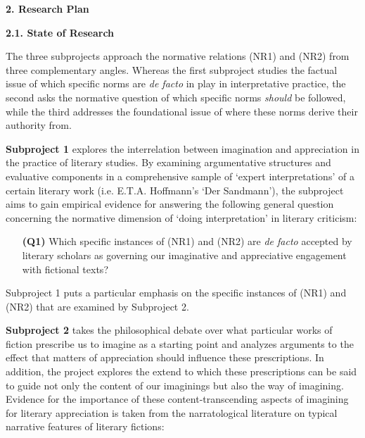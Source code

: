 \noindent\textbf{\large 2.  Research Plan}

\noindent\textbf{2.1.  State of Research}

\noindent The three subprojects approach the normative relations (NR1) and (NR2) from three complementary angles. Whereas the first subproject studies the factual issue of which specific norms are \emph{de facto} in play in interpretative practice, the second asks the normative question of which specific norms \emph{should} be followed, while the third addresses the foundational issue of where these norms derive their authority from.

\vspace{.2cm}
\noindent\textbf{Subproject 1} explores the interrelation between imagination and appreciation in the practice of literary studies. By examining argumentative structures and evaluative components in a comprehensive sample of `expert interpretations' of a certain literary work (i.e. E.T.A. Hoffmann's `Der Sandmann'), the subproject aims to gain empirical evidence for answering the following general question concerning the normative dimension of `doing interpretation' in literary criticism:

\vspace{-.1cm}
\begin{itemize}[leftmargin=2cm]
\item[\textbf{(Q1)}] Which specific instances of (NR1) and (NR2) are \emph{de facto} accepted by literary scholars as governing our imaginative and appreciative engagement with fictional texts?
\end{itemize}
\vspace{-.1cm}

\noindent Subproject 1 puts a particular emphasis on the specific instances of (NR1) and (NR2) that are examined by Subproject 2.

\vspace{.2cm}
\noindent\textbf{Subproject 2} takes the philosophical debate over what particular works of fiction prescribe us to imagine as a starting point and analyzes arguments to the effect that matters of appreciation should influence these prescriptions. In addition, the project explores the extend to which these prescriptions can be said to guide not only the content of our imaginings but also the way of imagining. Evidence for the importance of these content-transcending aspects of imagining for literary appreciation is taken from the narratological literature on typical narrative features of literary fictions:

